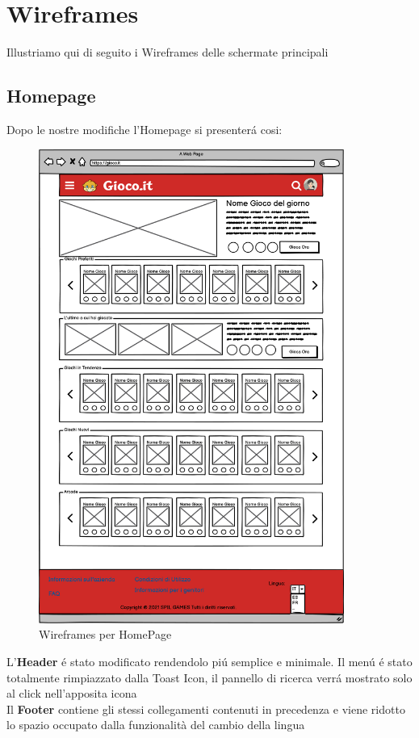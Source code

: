 \documentclass[../Report.tex]{subfiles}
\begin{document}
    \section{Wireframes}
    Illustriamo qui di seguito i Wireframes delle schermate principali

    \subsection{Homepage}
    Dopo le nostre modifiche l'Homepage si presenterá cosi:

    \begin{figure}[H]
        \centering
        \includegraphics[width=10cm]{WHomepage.png}
        \caption{Wireframes per HomePage}
    \end{figure}

         L'\textbf{Header} é stato modificato rendendolo piú semplice e minimale. Il menú é stato totalmente rimpiazzato dalla Toast Icon, il pannello di ricerca verrá mostrato solo al click nell'apposita icona\\
         
         Il \textbf{Footer} contiene gli stessi collegamenti contenuti in precedenza e viene ridotto lo spazio occupato dalla funzionalità del cambio della lingua\\
\end{document}
